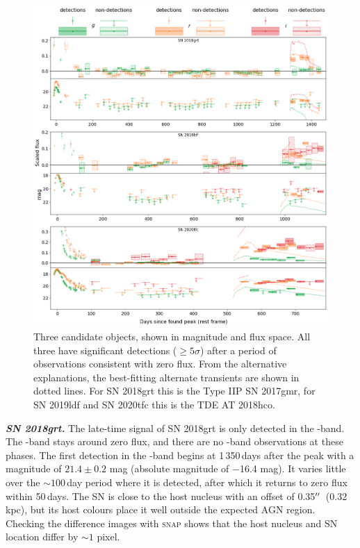 \documentclass[a4paper,oneside,12pt, class=Latex/Classes/PhDthesisPSnPDF, crop=false]{standalone}
\begin{document}
\begin{figure}
 \centering
 \includegraphics[width=\textwidth]{../Images/chapter_3/candid_plots.png}
 \caption[Light curves of the three candidate objects.]{Three candidate objects, shown in magnitude and flux space. All three have significant detections ($\geq5\sigma$) after a period of observations consistent with zero flux. From the alternative explanations, the best-fitting alternate transients are shown in dotted lines. For SN 2018grt this is the Type IIP SN 2017gmr, for SN 2019ldf and SN 2020tfc this is the TDE AT 2018hco.}
 \label{candidates}
\end{figure}

\textit{\textbf{SN 2018grt.}}
The late-time signal of SN 2018grt is only detected in the \ztfr-band. The \ztfg-band stays around zero flux, and there are no \ztfi-band observations at these phases. The first detection in the \ztfr-band begins at 1\,350\,days after the peak with a magnitude of $21.4\pm0.2$ mag (absolute magnitude of $-$16.4 mag). It varies little over the $\sim100$\,day period where it is detected, after which it returns to zero flux within 50\,days. The SN is close to the host nucleus with an offset of 0.35$^{\prime\prime}$~(0.32 kpc), but its host colours place it well outside the expected AGN region. Checking the difference images with \textsc{snap} shows that the host nucleus and SN location differ by $\sim1$ pixel.
\end{document}
